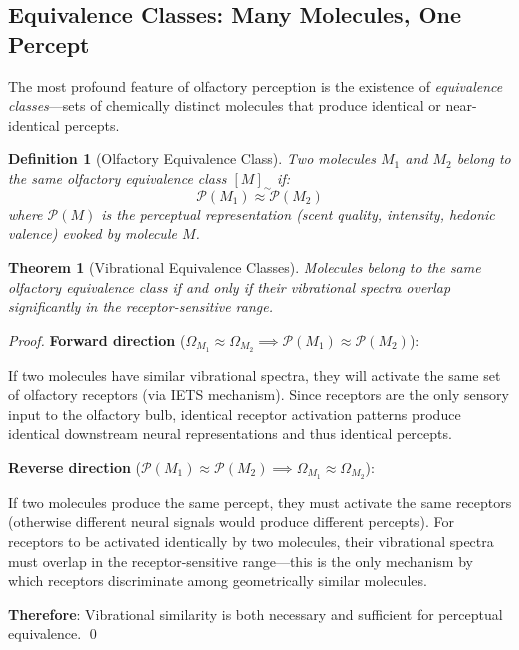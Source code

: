 \documentclass[12pt,a4paper]{article}
\newtheorem{theorem}{Theorem}
\newtheorem{definition}{Definition}
\begin{document}
\subsection{Equivalence Classes: Many Molecules, One Percept}

The most profound feature of olfactory perception is the existence of \textit{equivalence classes}—sets of chemically distinct molecules that produce identical or near-identical percepts.

\begin{definition}[Olfactory Equivalence Class]
\label{def:olfactory_equivalence}
Two molecules $M_1$ and $M_2$ belong to the same olfactory equivalence class $[M]_{\sim}$ if:
\begin{equation}
\mathcal{P}(M_1) \approx \mathcal{P}(M_2)
\end{equation}
where $\mathcal{P}(M)$ is the perceptual representation (scent quality, intensity, hedonic valence) evoked by molecule $M$.
\end{definition}

\begin{theorem}[Vibrational Equivalence Classes]
\label{thm:vibrational_equivalence}
Molecules belong to the same olfactory equivalence class if and only if their vibrational spectra overlap significantly in the receptor-sensitive range.
\end{theorem}

\begin{proof}
\textbf{Forward direction} ($\Omega_{M_1} \approx \Omega_{M_2} \implies \mathcal{P}(M_1) \approx \mathcal{P}(M_2)$):

If two molecules have similar vibrational spectra, they will activate the same set of olfactory receptors (via IETS mechanism). Since receptors are the only sensory input to the olfactory bulb, identical receptor activation patterns produce identical downstream neural representations and thus identical percepts.

\textbf{Reverse direction} ($\mathcal{P}(M_1) \approx \mathcal{P}(M_2) \implies \Omega_{M_1} \approx \Omega_{M_2}$):

If two molecules produce the same percept, they must activate the same receptors (otherwise different neural signals would produce different percepts). For receptors to be activated identically by two molecules, their vibrational spectra must overlap in the receptor-sensitive range—this is the only mechanism by which receptors discriminate among geometrically similar molecules.

\textbf{Therefore}: Vibrational similarity is both necessary and sufficient for perceptual equivalence. \qed
\end{proof}
\end{document}
